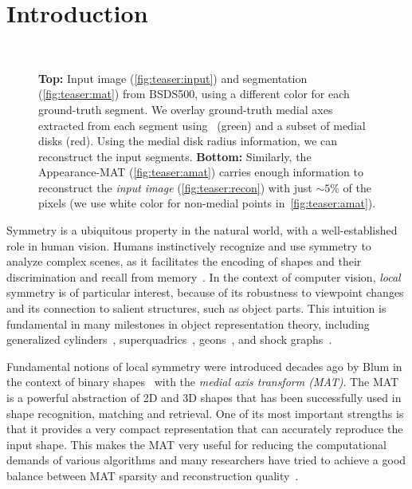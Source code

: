 \documentclass[10pt,twocolumn,letterpaper]{article}
\begin{document}
\section{Introduction}\label{sec:introduction}
\begin{figure}[!t]
\centering
{}
 \\
\caption{\textbf{Top:} Input image (\ref{fig:teaser:input}) and segmentation (\ref{fig:teaser:mat}) from BSDS500,
using a different color for each ground-truth segment. 
We overlay ground-truth medial axes extracted from each segment using~\cite{telea2002augmented} (green) and a subset of medial disks (red). 
Using the medial disk radius information, we can reconstruct the input segments. 
\textbf{Bottom:} Similarly, the Appearance-MAT (\ref{fig:teaser:amat}) carries enough information to reconstruct the 
 \emph{input image} (\ref{fig:teaser:recon}) with just $\sim 5\%$ of the pixels 
 (we use white color for non-medial points in~\ref{fig:teaser:amat}).}
\label{fig:teaser}
\end{figure}


Symmetry is a ubiquitous property in the natural world, with a well-established role in human vision.
Humans instinctively recognize and use symmetry to analyze complex scenes, as it facilitates the encoding of shapes and
their discrimination and recall from memory~\cite{barlow1979versatility,royer1981detection,wagemans1998parallel}.
In the context of computer vision, \emph{local} symmetry is of particular interest, 
because of its robustness to viewpoint changes and its connection to salient structures, such as object parts.
This intuition is fundamental in many milestones in object representation theory, including generalized
cylinders~\cite{binford1971visual}, superquadrics~\cite{barr1981superquadrics}, 
geons~\cite{biederman1987recognition}, and shock graphs~\cite{siddiqi1999shock}.

Fundamental notions of local symmetry were introduced decades ago by Blum in the context 
of binary shapes~\cite{blum1967transformation,blum1973biological} with the \emph{medial axis transform (MAT)}.
The MAT is a powerful abstraction of 2D and 3D shapes 
that has been successfully used in shape recognition, matching and retrieval. 
One of its most important strengths is that it provides a very compact representation that can
accurately reproduce the input shape. 
This makes the MAT very useful for reducing the computational demands of various algorithms and 
many researchers have tried to achieve a good balance
between MAT sparsity and reconstruction quality~\cite{tam2003shape,li2015q}.
\end{document}
